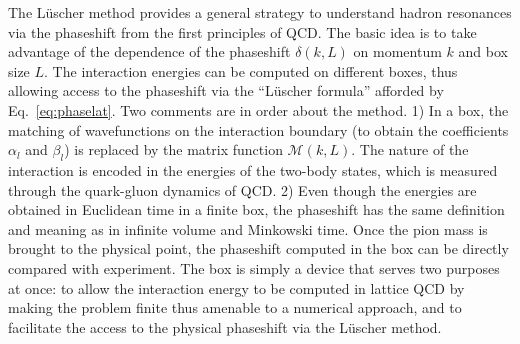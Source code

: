 \documentclass[aps,prd,reprint,showpacs,floatfix,longbibliography,,superscriptaddress]{revtex4-1}
\begin{document}
The L\"{u}scher method provides a general strategy to understand hadron resonances via the phaseshift from the first principles of QCD. 
The basic idea is to take advantage of the dependence of the phaseshift $\delta(k,L)$ on momentum $k$ and box size $L$. 
The interaction energies can be computed on different boxes, thus  
allowing access to the phaseshift via the ``L\"{u}scher formula'' afforded by Eq.~\ref{eq:phaselat}.
Two comments are in order about the method. 
1) In a box, the matching of wavefunctions on the interaction boundary (to 
obtain the coefficients $\alpha_l$ and $\beta_l$) is replaced by the matrix function $\mathcal{M}(k,L)$. 
The nature of the interaction is encoded in the energies of the two-body states, which is measured through the quark-gluon dynamics of QCD.
2)  Even though the energies are obtained in Euclidean time in a finite box, 
the phaseshift has the same definition and meaning as in infinite volume and Minkowski time. 
Once the pion mass is brought to the physical point,  the phaseshift computed in the box can be directly compared with experiment.
The box is simply a device that serves two purposes at once: 
to allow the interaction energy to be computed in lattice QCD by making the problem finite thus
amenable to a numerical approach, and to facilitate the access to the physical phaseshift via the L\"{u}scher method.
\end{document}
